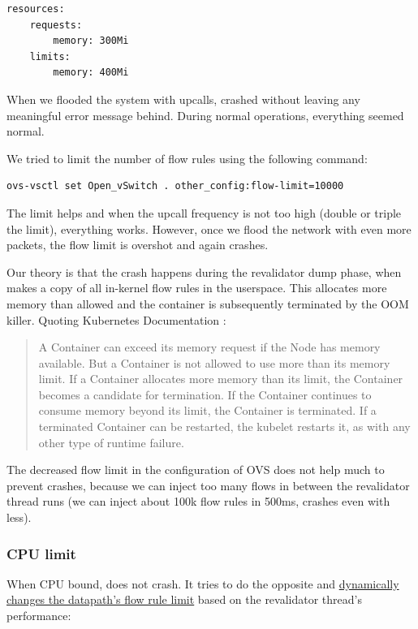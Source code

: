 \begin{verbatim}
resources:
    requests:
        memory: 300Mi
    limits:
        memory: 400Mi
\end{verbatim}

When we flooded the system with upcalls,  crashed without leaving any meaningful error message behind. During normal operations, everything seemed normal.

We tried to limit the number of flow rules using the following command:
\begin{verbatim}
ovs-vsctl set Open_vSwitch . other_config:flow-limit=10000
\end{verbatim}

The limit helps and when the upcall frequency is not too high (double or triple the limit), everything works. However, once we flood the network with even more packets, the flow limit is overshot and  again crashes.

Our theory is that the crash happens during the revalidator dump phase, when  makes a copy of all in-kernel flow rules in the userspace. This allocates more memory than allowed and the container is subsequently terminated by the OOM killer. Quoting Kubernetes Documentation \cite{KubeMemoryLimits}:

\begin{quote}
    A Container can exceed its memory request if the Node has memory available. But a Container is not allowed to use more than its memory limit. If a Container allocates more memory than its limit, the Container becomes a candidate for termination. If the Container continues to consume memory beyond its limit, the Container is terminated. If a terminated Container can be restarted, the kubelet restarts it, as with any other type of runtime failure.
\end{quote}

The decreased flow limit in the configuration of OVS does not help much to prevent crashes, because we can inject too many flows in between the revalidator thread runs (we can inject about 100k flow rules in 500ms,  crashes even with less).

\subsubsection{CPU limit}
\label{subsec:cpu-limit}

When CPU bound,  does not crash. It tries to do the opposite and \href{https://github.com/openvswitch/ovs/blob/e3ba0be48ca457ab3a1c9f1e3522e82218eca0f9/ofproto/ofproto-dpif-upcall.c\#L1031-L1041}{dynamically changes the datapath's flow rule limit} based on the revalidator thread's performance:

